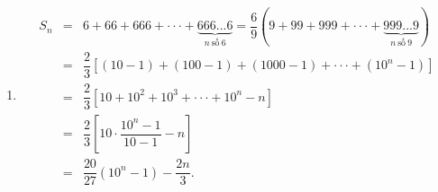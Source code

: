 \begin{vd}
{\begin{enumerate}
\begin{itemize}
			\end{itemize}	
			Vậy $S_n=\dfrac{9}{8}\left(9^n-1\right)+\dfrac{9^n-1}{8\cdot9^n}+2n=\dfrac{\left(9^n-1\right)\left(9^{n+1}+1\right)}{8\cdot9^n}+2n$.
			\item \begin{eqnarray*} S_n&=&6+66+666+\cdot\cdot\cdot+\underbrace{666...6}_{n~\text{số}~ 6}=\dfrac{6}{9}\left(9+99+999+\cdot\cdot\cdot+\underbrace{999...9}_{n~\text{số}~ 9}\right) \\
				&=&\dfrac{2}{3}\left[(10-1)+(100-1)+(1000-1)+\cdot\cdot\cdot+(10^n-1)\right]\\
				&=&\dfrac{2}{3}\left[10+10^2+10^3+\cdot\cdot\cdot+10^n-n\right]\\
				&=&\dfrac{2}{3}\left[10\cdot\dfrac{10^n-1}{10-1}-n\right]\\
				&=&\dfrac{20}{27}\left(10^n-1\right)-\dfrac{2n}{3}.
			\end{eqnarray*}
		\end{enumerate}
	}	
\end{vd}

